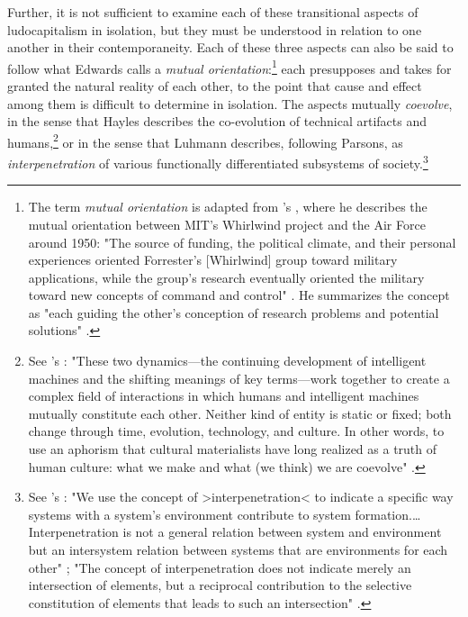 Further, it is not sufficient to examine each of these transitional aspects of ludocapitalism in isolation, but they must be understood in relation to one another in their contemporaneity. Each of these three aspects can also be said to follow what Edwards calls a \emph{mutual orientation}:\footnote{
  The term \emph{mutual orientation} is adapted from \citeauthor{Edwards1997-df}'s , where he describes the mutual orientation between MIT's Whirlwind project and the Air Force around 1950: "The source of funding, the political climate, and their personal experiences oriented Forrester's [Whirlwind] group toward military applications, while the group's research eventually oriented the military toward new concepts of command and control" \autocite[82]{Edwards1997-df}. He summarizes the concept as "each guiding the other's conception of research problems and potential solutions" \autocite[222]{Edwards1997-df}.
} each presupposes and takes for granted the natural reality of each other, to the point that cause and effect among them is difficult to determine in isolation. The aspects mutually \emph{coevolve}, in the sense that Hayles describes the co-evolution of technical artifacts and humans,\footnote{
  See \citeauthor{Hayles2005-ss}'s : "These two dynamics---the continuing development of intelligent machines and the shifting meanings of key terms---work together to create a complex field of interactions in which humans and intelligent machines mutually constitute each other. Neither kind of entity is static or fixed; both change through time, evolution, technology, and culture. In other words, to use an aphorism that cultural materialists have long realized as a truth of human culture: what we make and what (we think) we are coevolve" \autocite[216]{Hayles2005-ss}.
} or in the sense that Luhmann describes, following Parsons, as \emph{interpenetration} of various functionally differentiated subsystems of society.\footnote{
  See \citeauthor{Luhmann1995-et}'s : "We use the concept of >interpenetration< to indicate a specific way systems with a system's environment contribute to system formation.…Interpenetration is not a general relation between system and environment but an intersystem relation between systems that are environments for each other" \autocite[213]{Luhmann1995-et}; "The concept of interpenetration does not indicate merely an intersection of elements, but a reciprocal contribution to the selective constitution of elements that leads to such an intersection" \autocite[215]{Luhmann1995-et}.
}

